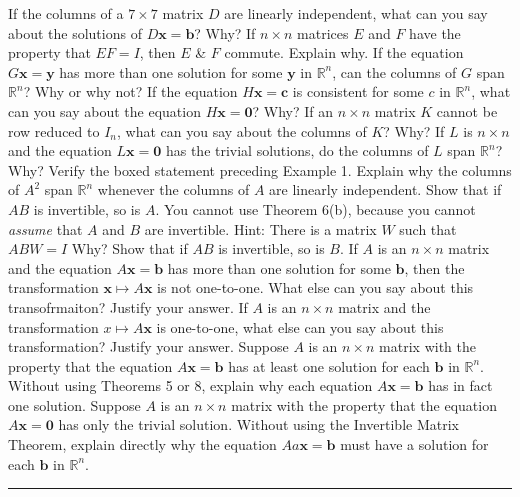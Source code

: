 \documentclass[11pt,answers]{exam} %
\renewcommand{\vec}[1]{\mathbf{#1}}
\begin{document}
\begin{questions}
    \question If the columns of a $7 \times 7$ matrix $D$ are linearly independent, what can you say about the solutions of $D\vec{x}=\vec{b}$? Why?
    \question If $n \times n$ matrices $E$ and $F$ have the property that $EF = I$, then $E$ \& $F$ commute. Explain why.
    \question If the equation $G\vec{x}=\vec{y}$ has more than one solution for some $\vec{y}$ in $\mathbb{R}^n$, can the columns of $G$ span $\mathbb{R}^n$? Why or why not?
    \question If the equation $H\vec{x}=\vec{c}$ is consistent for some $c$ in $\mathbb{R}^n$, what can you say about the equation $H\vec{x}=\vec{0}$? Why?
    \question If an $n \times n$ matrix $K$ cannot be row reduced to $I_n$, what can you say about the columns of $K$? Why?
    \question If $L$ is $n \times n$ and the equation $L\vec{x}=\vec{0}$ has the trivial solutions, do the columns of $L$ span $\mathbb{R}^n$? Why?
    \question Verify the boxed statement preceding Example 1.
    \question Explain why the columns of $A^2$ span $\mathbb{R}^n$ whenever the columns of $A$ are linearly independent.
    \question Show that if $AB$ is invertible, so is $A$. You cannot use Theorem 6(b), because you cannot \emph{assume} that $A$ and $B$ are invertible. Hint: There is a matrix $W$ such that $ABW = I$ Why?
    \question Show that if $AB$ is invertible, so is $B$.
    \question If $A$ is an $n \times n$ matrix and the equation $A\vec{x}=\vec{b}$ has more than one solution for some $\vec{b}$, then the transformation $\vec{x} \mapsto A\vec{x}$ is not one-to-one. What else can you say about this transofrmaiton? Justify your answer.
    \question If $A$ is an $n \times n$ matrix and the transformation $x\mapsto A\vec{x}$ is one-to-one, what else can you say about this transformation? Justify your answer.
    \question Suppose $A$ is an $n \times n$ matrix with the property that the equation $A\vec{x}=\vec{b}$ has at least one solution for each $\vec{b}$ in $\mathbb{R}^n$. Without using Theorems 5 or 8, explain why each equation $A\vec{x} = \vec{b}$ has in fact one solution.
    \question Suppose $A$ is an $n \times n$ matrix with the property that the equation $A\vec{x}=\vec{0}$ has only the trivial solution. Without using the Invertible Matrix Theorem, explain directly why the equation $Aa\vec{x}=\vec{b}$ must have a solution for each $\vec{b}$ in $\mathbb{R}^n$.
    \begin{center}\rule{4in}{0.1mm}\end{center}


\end{questions}
\end{document}
